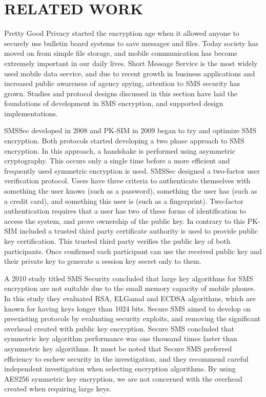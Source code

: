 \section{RELATED WORK}
Pretty Good Privacy \cite{pgp} started the encryption age when it allowed anyone to securely use bulletin board systems to save messages and files.
Today society has moved on from simple file storage, and mobile communication has become extremely important in our daily lives.
Short Message Service is the most widely used mobile data service, and due to recent growth in business applications and increased public awareness of agency spying, attention to SMS security has grown.
Studies and protocol designs discussed in this section have laid the foundations of development in SMS encryption, and supported design implementations.

SMSSec \cite{SMSSec} developed in 2008 and PK-SIM \cite{PkSim} in 2009 began to try and optimize SMS encryption.
Both protocols started developing a two phase approach to SMS encryption.
In this approach, a handshake is performed using asymmetric cryptography.
This occurs only a single time before a more efficient and frequently used symmetric encryption is used.
SMSSec designed a two-factor user verification protocol.
Users have three criteria to authenticate themselves with something the user knows (such as a password), something the user has (such as a credit card), and something this user is (such as a fingerprint).
Two-factor authentication requires that a user has two of these forms of identification to access the system, and prove ownership of the public key.
In contrary to this PK-SIM included a trusted third party certificate authority is used to provide public key certification.
This trusted third party verifies the public key of both participants.
Once confirmed each participant can use the received public key and their private key to generate a session key secret only to them.

A 2010 study titled SMS Security \cite{SmsSecurity} concluded that large key algorithms for SMS encryption are not suitable due to the small memory capacity of mobile phones.
In this study they evaluated RSA, ELGamal and ECDSA algorithms, which are known for having keys longer than 1024 bits.
Secure SMS \cite{SecureSms} aimed to develop on preexisting protocols by evaluating security exploits, and removing the significant overhead created with public key encryption.
Secure SMS concluded that symmetric key algorithm performance was one thousand times faster than asymmetric key algorithms.
It must be noted that Secure SMS preferred efficiency to eschew security in the investigation, and they recommend careful independent investigation when selecting encryption algorithms.
By using AES256 symmetric key encryption, we are not concerned with the overhead created when requiring large keys.

